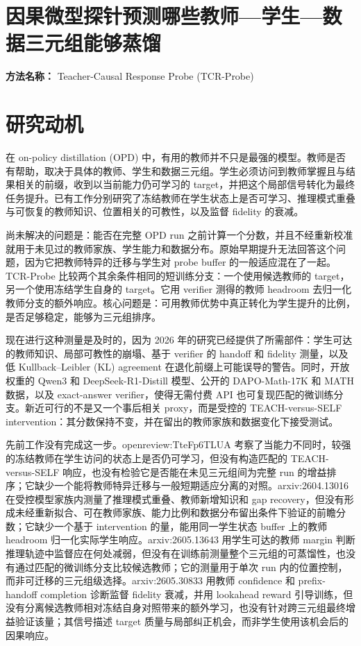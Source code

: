 \documentclass[10pt,a4paper]{article}
\begin{document}
\section*{因果微型探针预测哪些教师---学生---数据三元组能够蒸馏}
\textbf{方法名称：} Teacher-Causal Response Probe (TCR-Probe)
\section*{研究动机}
在 on-policy distillation (OPD) 中，有用的教师并不只是最强的模型。教师是否有帮助，取决于具体的教师、学生和数据三元组。学生必须访问到教师掌握且与结果相关的前缀，收到以当前能力仍可学习的 target，并把这个局部信号转化为最终任务提升。已有工作分别研究了冻结教师在学生状态上是否可学习、推理模式重叠与可恢复的教师知识、位置相关的可教性，以及监督 fidelity 的衰减。

尚未解决的问题是：能否在完整 OPD run 之前计算一个分数，并且不经重新校准就用于未见过的教师家族、学生能力和数据分布。原始早期提升无法回答这个问题，因为它把教师特异的迁移与学生对 probe buffer 的一般适应混在了一起。TCR-Probe 比较两个其余条件相同的短训练分支：一个使用候选教师的 target，另一个使用冻结学生自身的 target。它用 verifier 测得的教师 headroom 去归一化教师分支的额外响应。核心问题是：可用教师优势中真正转化为学生提升的比例，是否足够稳定，能够为三元组排序。

现在进行这种测量是及时的，因为 2026 年的研究已经提供了所需部件：学生可达的教师知识、局部可教性的崩塌、基于 verifier 的 handoff 和 fidelity 测量，以及低 Kullback--Leibler (KL) agreement 在退化前缀上可能误导的警告。同时，开放权重的 Qwen3 和 DeepSeek-R1-Distill 模型、公开的 DAPO-Math-17K 和 MATH 数据，以及 exact-answer verifier，使得无需付费 API 也可复现匹配的微训练分支。新近可行的不是又一个事后相关 proxy，而是受控的 TEACH-versus-SELF intervention：其分数保持不变，并在留出的教师家族和数据变化下接受测试。

先前工作没有完成这一步。openreview:TteFp6TLUA 考察了当能力不同时，较强的冻结教师在学生访问的状态上是否仍可学习，但没有构造匹配的 TEACH-versus-SELF 响应，也没有检验它是否能在未见三元组间为完整 run 的增益排序；它缺少一个能将教师特异迁移与一般短期适应分离的对照。arxiv:2604.13016 在受控模型家族内测量了推理模式重叠、教师新增知识和 gap recovery，但没有形成未经重新拟合、可在教师家族、能力比例和数据分布留出条件下验证的前瞻分数；它缺少一个基于 intervention 的量，能用同一学生状态 buffer 上的教师 headroom 归一化实际学生响应。arxiv:2605.13643 用学生可达的教师 margin 判断推理轨迹中监督应在何处减弱，但没有在训练前测量整个三元组的可蒸馏性，也没有通过匹配的微训练分支比较候选教师；它的测量用于单次 run 内的位置控制，而非可迁移的三元组级选择。arxiv:2605.30833 用教师 confidence 和 prefix-handoff completion 诊断监督 fidelity 衰减，并用 lookahead reward 引导训练，但没有分离候选教师相对冻结自身对照带来的额外学习，也没有针对跨三元组最终增益验证该量；其信号描述 target 质量与局部纠正机会，而非学生使用该机会后的因果响应。
\end{document}

